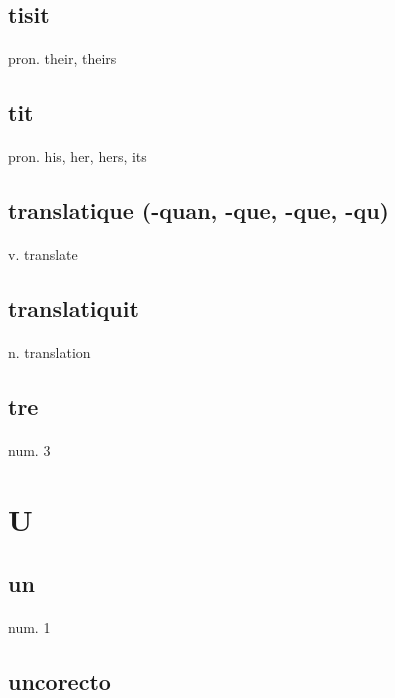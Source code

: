 \documentclass[UTF8]{article}
\begin{document}
    \subsection{tisit}
    \paragraph{} pron. their, theirs 
    \subsection{tit}
    \paragraph{} pron. his, her, hers, its 
    \subsection{translatique (-quan, -que, -que, -qu)}
    \paragraph{} v. translate
    \subsection{translatiquit}
    \paragraph{} n. translation
    \subsection{tre}
    \paragraph{} num. 3 
    \newpage \section{U}
    \subsection{un}
    \paragraph{} num. 1 
    \subsection{uncorecto}
\end{document}
